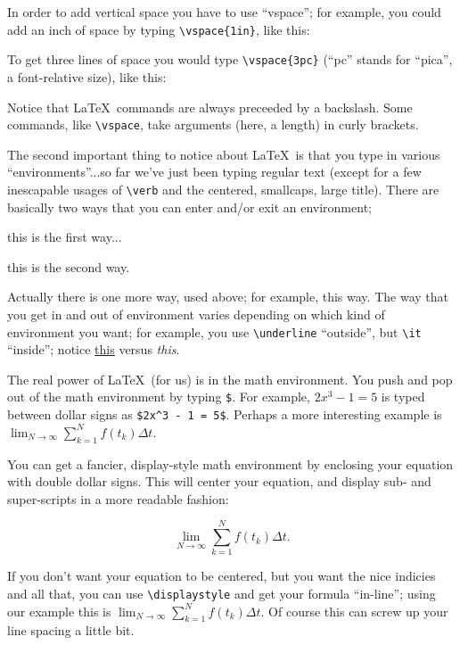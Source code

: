 \documentclass{article}
\begin{document}
In order to add vertical space you have to use ``vspace''; for example, 
you could add an inch of space by typing \verb|\vspace{1in}|, like this:
\vspace{1in}

To get three lines of space you would type \verb|\vspace{3pc}|
(``pc'' stands for ``pica'', a font-relative size), like this:
\vspace{3pc}

Notice that \LaTeX\ commands are always preceeded by a backslash.  
Some commands, like \verb|\vspace|, take arguments (here, a length) in
curly brackets.  

The second important thing to notice about \LaTeX\ is that you type 
in various ``environments''...so far we've just been typing regular 
text (except for a few inescapable usages of \verb|\verb| and the
centered, smallcaps, large title).  There are basically two ways that 
you can enter and/or exit an environment;
\vspace{1pc}

\centerline{this is the first way...}

\begin{center}
this is the second way.
\end{center}

\noindent Actually there is one more way, used above; for example, 
{\sc this way}.  The way that you get in and out of environment varies
depending on which kind of environment you want; for example, you use 
\verb|\underline| ``outside'', but \verb|\it| ``inside''; 
notice \underline{this} versus {\it this}.

The real power of \LaTeX\ (for us) is in the math environment. You 
push and pop out of the math environment by typing \verb|$|. For 
example, $2x^3 - 1 = 5$ is typed between dollar signs as
\verb|$2x^3 - 1 = 5$|. Perhaps a more interesting example is
$\lim_{N \to \infty} \sum_{k=1}^N f(t_k) \Delta t$.

You can get a fancier, display-style math 
environment by enclosing your equation with double dollar signs.  
This will center your equation, and display sub- and super-scripts in 
a more readable fashion:

$$\lim_{N \to \infty} \sum_{k=1}^N f(t_k) \Delta t.$$

If you don't want your equation to be centered, but you want the nice 
indicies and all that, you can use \verb|\displaystyle| and get your 
formula ``in-line''; using our example this is 
$\displaystyle \lim_{N \to \infty} \sum_{k=1}^N f(t_k) \Delta t.$  Of 
course this can screw up your line spacing a little bit.
\end{document}
